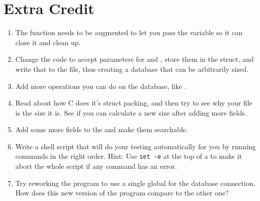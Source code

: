 \section{Extra Credit}

\begin{enumerate}
\item The  function needs to be augmented to let you pass the 
    variable so it can close it and clean up.
\item Change the code to accept parameters for  and , store them in the  struct, and write that to the file, thus creating
    a database that can be arbitrarily sized.
\item Add more operations you can do on the database, like .
\item Read about how C does it's struct packing, and then try to see why your
    file is the size it is.  See if you can calculate a new size after adding
    more fields.
\item Add some more fields to the  and make them searchable.
\item Write a shell script that will do your testing automatically for you
    by running commands in the right order.  Hint: Use \verb|set -e| at the
    top of a  to make it abort the whole script if any command
    has an error.
\item Try reworking the program to use a single global for the database connection.
    How does this new version of the program compare to the other one?
\end{enumerate}
